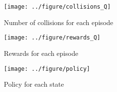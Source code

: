 \documentclass{article}
\begin{document}
	\begin{figure}[H]
		\centering
		\texttt{[image: ../figure/collisions\_Q]}
		\caption{Number of collisions for each episode}
		\label{fig:sarsa}
	\end{figure}

	\begin{figure}[H]
		\centering
		\texttt{[image: ../figure/rewards\_Q]}
		\caption{Rewards for each episode}
		\label{fig:sarsa}
	\end{figure}

	\begin{figure}[H]
		\centering
		\texttt{[image: ../figure/policy]}
		\caption{Policy for each state}
		\label{fig:tdvaluefunction}
	\end{figure}
\end{document}
